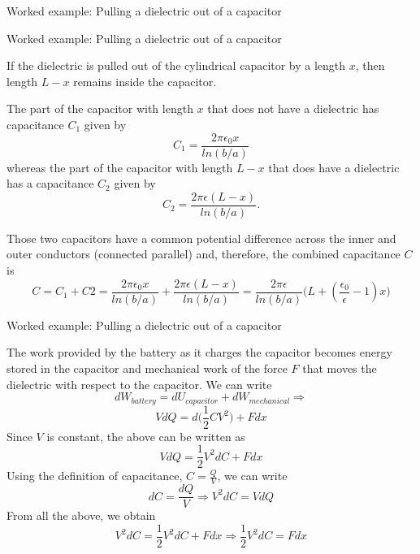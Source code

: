 {\begin{frame}{Worked example: Pulling a dielectric out of a capacitor}
\end{frame}

%
%
%

\begin{frame}{Worked example: Pulling a dielectric out of a capacitor}

  If the dielectric is pulled out of the cylindrical capacitor by a length $x$,
  then length $L-x$ remains inside the capacitor.

  The part of the capacitor with length $x$ that does not have a dielectric
  has capacitance $C_1$ given by
  \begin{equation*}
    C_1 = \frac{2\pi \epsilon_0 x}{ln(b/a)}
  \end{equation*}
  whereas the part of the capacitor with length $L-x$ that does have a
  dielectric has a capacitance $C_2$ given by
  \begin{equation*}
    C_2 = \frac{2\pi \epsilon (L-x)}{ln(b/a)}.
  \end{equation*}

  Those two capacitors have a common potential difference across the
  inner and outer conductors (connected parallel) and, therefore, the
  combined capacitance $C$ is
  \begin{equation*}
    C = C_1 + C2 =
     \frac{2\pi \epsilon_0 x}{ln(b/a)} +
     \frac{2\pi \epsilon (L-x)}{ln(b/a)} =
     \frac{2\pi \epsilon}{ln(b/a)}
         \Big(L + (\frac{\epsilon_0}{\epsilon}-1) x \Big)
  \end{equation*}

\end{frame}

%
%
%

\begin{frame}{Worked example: Pulling a dielectric out of a capacitor}

  The work provided by the battery as it charges the capacitor
  becomes energy stored in the capacitor and mechanical work of
  the force $F$ that moves the dielectric with respect to the capacitor.
  We can write
  \begin{equation*}
    dW_{battery} = dU_{capacitor} + dW_{mechanical} \Rightarrow
  \end{equation*}
  \begin{equation*}
    V dQ = d\Big(\frac{1}{2}CV^2\Big) + F dx
  \end{equation*}
  Since $V$ is constant, the above can be written as
  \begin{equation*}
    V dQ = \frac{1}{2}V^2 dC + F dx
  \end{equation*}
  Using the definition of capacitance, $C = \frac{Q}{V}$, we can write
  \begin{equation*}
    dC = \frac{dQ}{V} \Rightarrow V^2 dC = V dQ
  \end{equation*}
  From all the above, we obtain
  \begin{equation*}
    V^2 dC = \frac{1}{2}V^2 dC + F dx \Rightarrow
    \frac{1}{2}V^2 dC = F dx
  \end{equation*}


\end{frame}}
